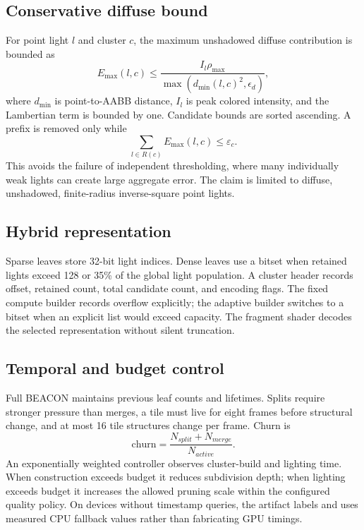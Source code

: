 \documentclass[10pt,twocolumn]{article}
\begin{document}
\subsection{Conservative diffuse bound}
For point light $l$ and cluster $c$, the maximum unshadowed diffuse contribution is bounded as
\begin{equation}
E_{\max}(l,c) \leq
\frac{I_l\rho_{\max}}{\max(d_{\min}(l,c)^2,\epsilon_d)},
\end{equation}
where $d_{\min}$ is point-to-AABB distance, $I_l$ is peak colored intensity, and the Lambertian term
is bounded by one. Candidate bounds are sorted ascending. A prefix is removed only while
\begin{equation}
\sum_{l\in R(c)}E_{\max}(l,c)\leq\varepsilon_c.
\end{equation}
This avoids the failure of independent thresholding, where many individually weak lights can create
large aggregate error. The claim is limited to diffuse, unshadowed, finite-radius inverse-square
point lights.

\subsection{Hybrid representation}
Sparse leaves store 32-bit light indices. Dense leaves use a bitset when retained lights exceed 128
or 35\% of the global light population. A cluster header records offset, retained count, total
candidate count, and encoding flags. The fixed compute builder records overflow explicitly; the
adaptive builder switches to a bitset when an explicit list would exceed capacity. The fragment
shader decodes the selected representation without silent truncation.

\subsection{Temporal and budget control}
Full BEACON maintains previous leaf counts and lifetimes. Splits require stronger pressure than
merges, a tile must live for eight frames before structural change, and at most 16 tile structures
change per frame. Churn is
\begin{equation}
\mathrm{churn}=\frac{N_{split}+N_{merge}}{N_{active}}.
\end{equation}
An exponentially weighted controller observes cluster-build and lighting time. When construction
exceeds budget it reduces subdivision depth; when lighting exceeds budget it increases the allowed
pruning scale within the configured quality policy. On devices without timestamp queries, the
artifact labels and uses measured CPU fallback values rather than fabricating GPU timings.
\end{document}
